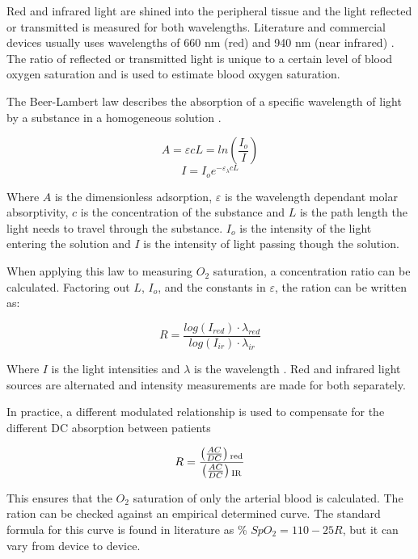 \medskip
Red and infrared light are shined into the peripheral tissue and the light reflected or transmitted is measured for both wavelengths. Literature and commercial devices usually uses wavelengths of 660 nm (red) and 940 nm (near infrared) \citep{tytler1986nellcor} \citep{ti2012datasheet} \citep{bagha2011real} \citep{bheema2013spo2} \citep{duun2007novel}. The ratio of reflected or transmitted light is unique to a certain level of blood oxygen saturation and is used to estimate blood oxygen saturation.

\medskip
The Beer-Lambert law describes the absorption of a specific wavelength of light by a substance in a homogeneous solution \citep{bagha2011real}. 

$$A=\varepsilon cL=ln\left( \frac{I_o}{I}\right) $$
$$I=I_o e^{-\varepsilon _\lambda cL}$$

\medskip
Where $A$ is the dimensionless adsorption, $\varepsilon$ is the wavelength dependant molar absorptivity, $c$ is the concentration of the substance and $L$ is the path length the light needs to travel through the substance. $I_o$ is the intensity of the light entering the solution and $I$ is the intensity of light passing though the solution.

\medskip
When applying this law to measuring $O_2$ saturation, a concentration ratio can be calculated. Factoring out $L$, $I_o$, and the constants in $\varepsilon$, the ration can be written as:

$$R=\frac{log\left( I_{red} \right)\cdot\lambda _{red}}{log\left( I_{ir} \right)\cdot\lambda _{ir}}$$

\medskip
Where $I$ is the light intensities and $\lambda$ is the wavelength \citep{ti2012datasheet}.  Red and infrared light sources are alternated and intensity measurements are made for both separately.

\medskip
In practice, a different modulated relationship is used to compensate for the different DC absorption between patients \citep{konig1998reflectance} \citep{duun2007novel} \citep{bheema2013spo2}   \citep{bagha2011real}  \citep{nitzan2014calibration} \citep{ti2012application}

$$R = \frac{\left(\frac{AC}{DC}\right)\textsubscript{red}}{\left(\frac{AC}{DC}\right)\textsubscript{IR}} $$

\medskip
This ensures that the $O_2$ saturation of only the arterial blood is calculated. The ration can be checked against an empirical determined curve. The standard formula for this curve is found in literature as \% $SpO_2  = 110-25R$, \citep{ti2012application} but it can vary from device to device.


